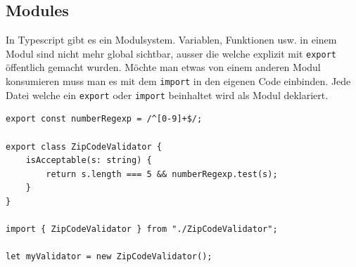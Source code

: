 \subsection{Modules}

In Typescript gibt es ein Modulsystem. Variablen, Funktionen usw. in einem Modul sind nicht mehr global sichtbar, ausser die welche explizit mit \lstinline|export| öffentlich gemacht wurden. Möchte man etwas von einem anderen Modul konsumieren muss man es mit dem \lstinline|import| in den eigenen Code einbinden. Jede Datei welche ein \lstinline|export| oder \lstinline|import| beinhaltet wird als Modul deklariert. 

\begin{lstlisting}[label=lst:typescript-modules,caption=Modules]
export const numberRegexp = /^[0-9]+$/;

export class ZipCodeValidator {
	isAcceptable(s: string) {
		return s.length === 5 && numberRegexp.test(s);
	}
}

import { ZipCodeValidator } from "./ZipCodeValidator";

let myValidator = new ZipCodeValidator();
\end{lstlisting}